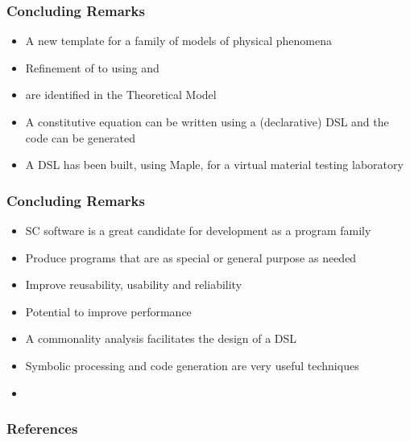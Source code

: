 \documentclass[t,12pt,numbers,fleqn]{beamer}
\newcounter{temp}
\begin{document}

\begin{frame}

\frametitle<presentation>{Concluding Remarks}

\begin{itemize}
\item A new template for a family of models of physical phenomena
\item Refinement of  to  using  and
\item {} are identified in the Theoretical Model
\item A constitutive equation can be written using a (declarative) DSL and the code can be generated
\item A DSL has been built, using Maple, for a virtual material testing laboratory
\end{itemize}
  
\end{frame}


\begin{frame}

\frametitle<presentation>{Concluding Remarks}

\begin{itemize}
\item SC software is a great candidate for development as a program family
\item Produce programs that are as special or general purpose as needed %
\item Improve reusability, usability and reliability
\item Potential to improve performance
\item A commonality analysis facilitates the design of a DSL
\item Symbolic processing and code generation are very useful techniques
\item {}
\end{itemize}
  
\end{frame}



\begin{frame}[allowframebreaks]
\frametitle{References}



\end{frame}

\end{document}
